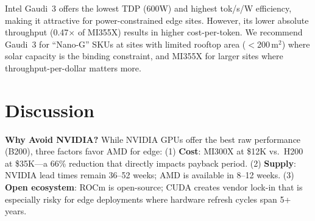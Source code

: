 \documentclass[conference,10pt,letterpaper]{IEEEtran}
\begin{document}
\begin{table}[!t]
\caption{AMD vs.\ Intel Edge Appliance Comparison}
\label{tab:vsIntel}
\centering\scriptsize
{}
\end{table}

Intel Gaudi~3 offers the lowest TDP (600W) and highest tok/s/W efficiency, making it attractive for power-constrained edge sites. However, its lower absolute throughput (0.47$\times$ of MI355X) results in higher cost-per-token. We recommend Gaudi~3 for ``Nano-G'' SKUs at sites with limited rooftop area ($<$200\,m$^2$) where solar capacity is the binding constraint, and MI355X for larger sites where throughput-per-dollar matters more.

\section{Discussion}
\label{sec:discussion}

\textbf{Why Avoid NVIDIA?} While NVIDIA GPUs offer the best raw performance (B200), three factors favor AMD for edge: (1) \textbf{Cost}: MI300X at \$12K vs.\ H200 at \$35K---a 66\% reduction that directly impacts payback period. (2) \textbf{Supply}: NVIDIA lead times remain 36--52 weeks; AMD is available in 8--12 weeks. (3) \textbf{Open ecosystem}: ROCm is open-source; CUDA creates vendor lock-in that is especially risky for edge deployments where hardware refresh cycles span 5+ years.
\end{document}
